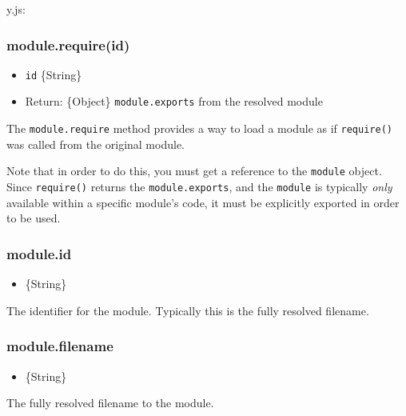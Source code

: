 y.js:

\begin{Shaded}
\begin{Highlighting}[]
 \NormalTok{);}
\NormalTok{(}\NormalTok{);}
\end{Highlighting}
\end{Shaded}

\subsubsection{module.require(id)}

\begin{itemize}
\item
  \texttt{id} \{String\}
\item
  Return: \{Object\} \texttt{module.exports} from the resolved module
\end{itemize}

The \texttt{module.require} method provides a way to load a module as if
\texttt{require()} was called from the original module.

Note that in order to do this, you must get a reference to the
\texttt{module} object. Since \texttt{require()} returns the
\texttt{module.exports}, and the \texttt{module} is typically
\emph{only} available within a specific module's code, it must be
explicitly exported in order to be used.

\subsubsection{module.id}

\begin{itemize}
\item
  \{String\}
\end{itemize}

The identifier for the module. Typically this is the fully resolved
filename.

\subsubsection{module.filename}

\begin{itemize}
\item
  \{String\}
\end{itemize}

The fully resolved filename to the module.

